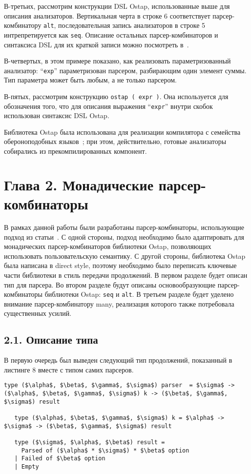 В-третьих, рассмотрим конструкции DSL Ostap, использованные выше для описания анализаторов. Вертикальная черта в строке 6 соответствует парсер-комбинатору \lstinline|alt|, последовательная запись анализаторов в строке 5 интрепретируется как \lstinline|seq|. Описание остальных парсер-комбинаторов и синтаксиса DSL для их краткой записи можно посмотреть в~\cite{ostap}.

В-четвертых, в этом примере показано, как реализовать параметризованный анализатор: ``\lstinline|exp|'' параметризован парсером, разбирающим один элемент суммы. Тип параметра может быть любым, а не только парсером.

В-пятых, рассмотрим конструкцию \lstinline|ostap ( expr )|. Она используется для обозначения того, что для описания выражения ``\lstinline|expr|'' внутри скобок использован синтаксис DSL Ostap.

Библиотека Ostap была использована для реализации компилятора с семейства обероноподобных языков~\cite{boulytchev2015combinators}; при этом, действительно, готовые анализаторы собирались из прекомпилированных компонент.

\section*{Глава 2. Монадические парсер-комбинаторы}

В рамках данной работы были разработаны парсер-комбинаторы, использующие подход из статьи~\cite{meerkat}. С одной стороны, подход необходимо было адаптировать для монадических парсер-комбинаторов библиотеки Ostap, позволяющих использовать пользовательскую семантику. С другой стороны, библиотека Ostap была написана в direct style, поэтому необходимо было переписать ключевые части библиотеки в стиль передачи продолжений.  В первом разделе будет описан тип для парсера. Во втором разделе будут описаны основообразующие парсер-комбинаторы библиотеки Ostap: \lstinline|seq| и \lstinline|alt|. В третьем разделе будет уделено внимание парсер-комбинатору many, реализация которого также потребовала существенных усилий.

\subsection*{2.1. Описание типа}

В первую очередь был выведен следующий тип продолжений, показанный в листинге 8 вместе с типом самих парсеров.

\begin{lstlisting}[basicstyle=\small, caption=Тип парсера и продолжения]
   type ($\alpha$, $\beta$, $\gamma$, $\sigma$) parser  = $\sigma$ -> ($\alpha$, $\beta$, $\gamma$, $\sigma$) k -> ($\beta$, $\gamma$, $\sigma$) result

   type ($\alpha$, $\beta$, $\gamma$, $\sigma$) k = $\alpha$ -> $\sigma$ -> ($\beta$, $\gamma$, $\sigma$) result

   type ($\sigma$, $\alpha$, $\beta$) result =
     Parsed of ($\alpha$ * $\sigma$) * $\beta$ option
   | Failed of $\beta$ option
   | Empty
\end{lstlisting}

